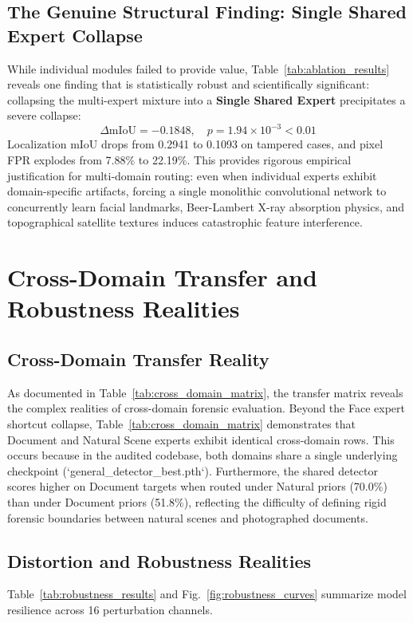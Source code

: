 \documentclass[conference]{IEEEtran}
\begin{document}
\subsection{The Genuine Structural Finding: Single Shared Expert Collapse}
While individual modules failed to provide value, Table~\ref{tab:ablation_results} reveals one finding that is statistically robust and scientifically significant: collapsing the multi-expert mixture into a \textbf{Single Shared Expert} precipitates a severe collapse:
\begin{equation}
    \Delta\text{mIoU} = -0.1848, \quad p = 1.94 \times 10^{-3} < 0.01
\end{equation}
Localization mIoU drops from 0.2941 to 0.1093 on tampered cases, and pixel FPR explodes from 7.88\% to 22.19\%. This provides rigorous empirical justification for multi-domain routing: even when individual experts exhibit domain-specific artifacts, forcing a single monolithic convolutional network to concurrently learn facial landmarks, Beer-Lambert X-ray absorption physics, and topographical satellite textures induces catastrophic feature interference.

\section{Cross-Domain Transfer and Robustness Realities}

\subsection{Cross-Domain Transfer Reality}
As documented in Table~\ref{tab:cross_domain_matrix}, the transfer matrix reveals the complex realities of cross-domain forensic evaluation. Beyond the Face expert shortcut collapse, Table~\ref{tab:cross_domain_matrix} demonstrates that Document and Natural Scene experts exhibit identical cross-domain rows. This occurs because in the audited codebase, both domains share a single underlying checkpoint (`general_detector_best.pth`). Furthermore, the shared detector scores higher on Document targets when routed under Natural priors (70.0\%) than under Document priors (51.8\%), reflecting the difficulty of defining rigid forensic boundaries between natural scenes and photographed documents.

\subsection{Distortion and Robustness Realities}
Table~\ref{tab:robustness_results} and Fig.~\ref{fig:robustness_curves} summarize model resilience across 16 perturbation channels.
\end{document}
